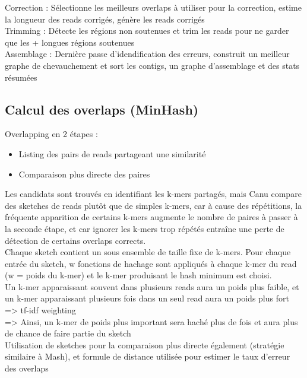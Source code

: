 \documentclass[12pt]{article}
\begin{document}
Correction : Sélectionne les meilleurs overlaps à utiliser pour la correction, estime la longueur des reads corrigés, génère les reads corrigés \\

Trimming : Détecte les régions non soutenues et trim les reads pour ne garder que les + longues régions soutenues \\

Assemblage : Dernière passe d'idendification des erreurs, construit un meilleur graphe de chevauchement et sort les contigs, un graphe d'assemblage
			 et des stats résumées \\
			 
			 
\subsection{Calcul des overlaps (MinHash)}
			 
Overlapping en 2 étapes : \\
\begin{itemize}
	\item Listing des pairs de reads partageant une similarité
	\item Comparaison plus directe des paires
\end{itemize}

Les candidats sont trouvés en identifiant les k-mers partagés, mais Canu compare des sketches de reads plutôt que de simples k-mers, car à cause des répétitions, la fréquente apparition de certains k-mers augmente le nombre de paires à passer à la seconde étape, et car ignorer les k-mers trop répétés entraîne une perte de détection de certains overlaps corrects.  \\

Chaque sketch contient un sous ensemble de taille fixe de k-mers. Pour chaque entrée du sketch, w fonctions de hachage sont appliqués à chaque k-mer du read (w = poids du k-mer) et le k-mer produisant le hash minimum est choisi. \\

Un k-mer apparaissant souvent dans plusieurs reads aura un poids plus faible, et un k-mer apparaissant plusieurs fois dans un seul read aura un poids plus fort => tf-idf weighting \\

=> Ainsi, un k-mer de poids plus important sera haché plus de fois et aura plus de chance de faire partie du sketch \\

Utilisation de sketches pour la comparaison plus directe également (stratégie similaire à Mash), et formule de distance utilisée pour estimer
le taux d'erreur des overlaps
\end{document}
